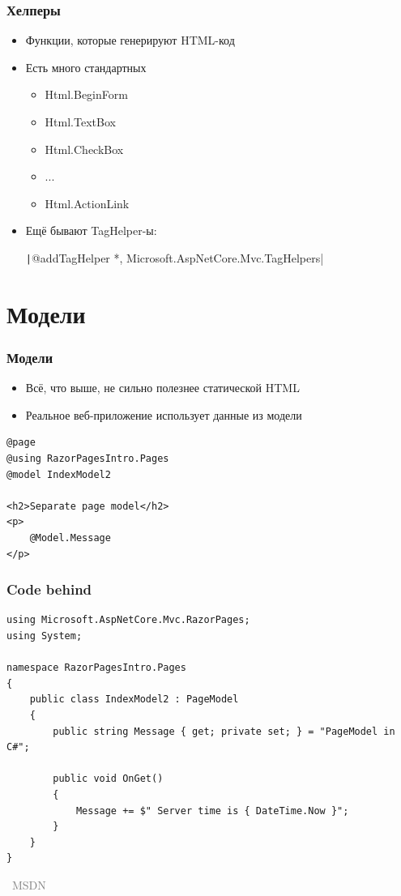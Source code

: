 \documentclass[xetex,mathserif,serif]{beamer}
\newcommand{\attribution}[1] {
\vspace{-5mm}\begin{flushright}\begin{scriptsize}\textcolor{gray}{\textcopyright\, #1}\end{scriptsize}\end{flushright}
}
\begin{document}
    \begin{frame}
        \frametitle{Хелперы}
        \begin{itemize}
            \item Функции, которые генерируют HTML-код
            \item Есть много стандартных
            \begin{itemize}
                \item Html.BeginForm
                \item Html.TextBox
                \item Html.CheckBox
                \item ...
                \item Html.ActionLink
            \end{itemize}
            \item Ещё бывают TagHelper-ы:
            
            \texttt|@addTagHelper *, Microsoft.AspNetCore.Mvc.TagHelpers|
        \end{itemize}
    \end{frame}

    \section{Модели}

    \begin{frame}[fragile]
        \frametitle{Модели}
        \begin{itemize}
            \item Всё, что выше, не сильно полезнее статической HTML
            \item Реальное веб-приложение использует данные из модели
        \end{itemize}
        \begin{verbatim}
@page
@using RazorPagesIntro.Pages
@model IndexModel2

<h2>Separate page model</h2>
<p>
    @Model.Message
</p>
        \end{verbatim}
    \end{frame}

    \begin{frame}[fragile]
        \frametitle{Code behind}
        \begin{small}
            \begin{verbatim}
using Microsoft.AspNetCore.Mvc.RazorPages;
using System;

namespace RazorPagesIntro.Pages
{
    public class IndexModel2 : PageModel
    {
        public string Message { get; private set; } = "PageModel in C#";

        public void OnGet()
        {
            Message += $" Server time is { DateTime.Now }";
        }
    }
}
            \end{verbatim}
        \end{small}
        \attribution{MSDN}
    \end{frame}
\end{document}
